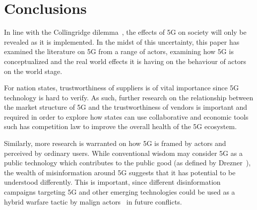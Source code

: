 \section{Conclusions}
In line with the Collingridge dilemma~\cite{collingridge1982social}, the effects
of 5G on society will only be revealed as it is implemented. In the midst of
this uncertainty, this paper has examined the literature on 5G from a range of
actors, examining how 5G is conceptualized and the real world effects it is
having on the behaviour of actors on the world stage.

For nation states, trustworthiness of suppliers is of vital importance since 5G
technology is hard to verify. As such, further research on the relationship
between the market structure of 5G and the trustworthiness of vendors is
important and required in order to explore how states can use collaborative and
economic tools such has competition law to improve the overall health of the 5G
ecosystem.

Similarly, more research is warranted on how 5G is framed by actors and
perceived by ordinary users. While conventional wisdom may consider 5G as a
public technology which contributes to the public good (as defined by
Drezner~\cite{drezner2019technological}), the wealth of misinformation around
5G suggests that it has potential to be understood differently. This is
important, since different disinformation campaigns targeting 5G and other
emerging technologies could be used as a hybrid warfare tactic by malign
actors~\cite{bekkers2019hybrid} in future conflicts.
